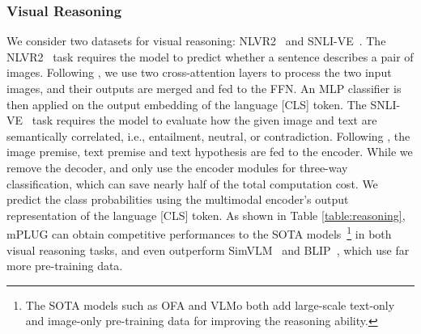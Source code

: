 \documentclass[11pt]{article}
\newcommand{\modelname}{mPLUG }
\begin{document}
\subsubsection{Visual Reasoning}
We consider two datasets for visual reasoning: NLVR2~\cite{suhr2018corpus} and SNLI-VE~\cite{snlive}. The NLVR2~\cite{suhr2018corpus} task requires the model to predict whether a sentence describes a pair of images. Following \cite{li2022blip}, we use two cross-attention layers to process the two input images, and their outputs are merged and fed to the FFN. An MLP classifier is then applied on the output embedding of the language [CLS] token. The SNLI-VE~\cite{snlive} task requires the model to evaluate how the given image and text are semantically correlated, i.e., entailment, neutral, or contradiction. Following \cite{wang2022OFA}, the image premise, text premise and text hypothesis are fed to the encoder. While we remove the decoder, and only use the encoder modules for three-way classification, which can save nearly half of the total computation cost. We predict the class probabilities using the multimodal encoder's output representation of the language [CLS] token. As shown in Table \ref{table:reasoning}, \modelname can obtain competitive performances to the SOTA models~\footnote{The SOTA models  such as OFA and VLMo both add large-scale text-only and image-only pre-training data for improving the reasoning ability.} in both visual reasoning tasks, and even outperform SimVLM~\cite{wang2021simvlm} and BLIP~\cite{li2022blip}, which use far more pre-training data.
\end{document}
